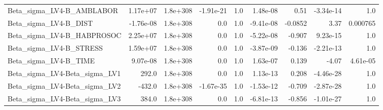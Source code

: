\begin{tabular}{lrrrrrrrr}
Beta\_sigma\_LV4-B\_AMBLABOR     &    1.17e+07 &     1.8e+308 & -1.91e-21 &      1.0 &   1.48e-08 &        0.51 &    -3.34e-14 &           1.0 \\
Beta\_sigma\_LV4-B\_DIST         &   -1.76e-08 &     1.8e+308 &       0.0 &      1.0 &  -9.41e-08 &     -0.0852 &         3.37 &      0.000765 \\
Beta\_sigma\_LV4-B\_HABPROSOC    &    2.25e+07 &     1.8e+308 &       0.0 &      1.0 &  -5.22e-08 &      -0.907 &     9.23e-15 &           1.0 \\
Beta\_sigma\_LV4-B\_STRESS       &    1.59e+07 &     1.8e+308 &       0.0 &      1.0 &  -3.87e-09 &      -0.136 &    -2.21e-13 &           1.0 \\
Beta\_sigma\_LV4-B\_TIME         &    9.07e-08 &     1.8e+308 &       0.0 &      1.0 &   1.63e-07 &       0.139 &        -4.07 &      4.61e-05 \\
Beta\_sigma\_LV4-Beta\_sigma\_LV1 &       292.0 &     1.8e+308 &       0.0 &      1.0 &   1.13e-13 &       0.208 &    -4.46e-28 &           1.0 \\
Beta\_sigma\_LV4-Beta\_sigma\_LV2 &      -432.0 &     1.8e+308 & -1.67e-35 &      1.0 &  -1.53e-12 &      -0.709 &    -2.87e-28 &           1.0 \\
Beta\_sigma\_LV4-Beta\_sigma\_LV3 &       384.0 &     1.8e+308 &       0.0 &      1.0 &  -6.81e-13 &      -0.856 &    -1.01e-27 &           1.0 \\
\bottomrule
\end{tabular}
